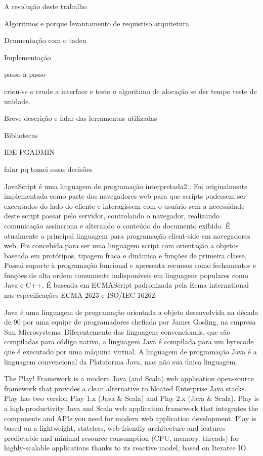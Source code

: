 A resolução deste trabalho

	Algoritmos e porque
	levantamento de requistiso
	arquitetura

	Dcumentação com o tadeu

	Implementação

	passo a passo

	criou-se o crude a interface e testo o algoritimo de alocação se der tempo teste de unidade.



Breve descrição e falar das ferramentas utilizadas

Bibliotecas

IDE
PGADMIN

falar pq tomei essas decisões


	JavaScript é uma linguagem de programação interpretada2 . Foi originalmente implementada como parte dos navegadores web para que scripts pudessem ser executados do lado do cliente e interagissem com o usuário sem a necessidade deste script passar pelo servidor, controlando o navegador, realizando comunicação assíncrona e alterando o conteúdo do documento exibido.
	É atualmente a principal linguagem para programação client-side em navegadores web. Foi concebida para ser uma linguagem script com orientação a objetos baseada em protótipos, tipagem fraca e dinâmica e funções de primeira classe. Possui suporte à programação funcional e apresenta recursos como fechamentos e funções de alta ordem comumente indisponíveis em linguagens populares como Java e C++.
	É baseada em ECMAScript padronizada pela Ecma international nas especificações ECMA-2623 e ISO/IEC 16262.\cite{alterar}

	Java é uma linguagem de programação orientada a objeto desenvolvida na década de 90 por uma equipe de programadores chefiada por James Gosling, na empresa Sun Microsystems. Diferentemente das linguagens convencionais, que são compiladas para código nativo, a linguagem Java é compilada para um bytecode que é executado por uma máquina virtual. A linguagem de programação Java é a linguagem convencional da Plataforma Java, mas não sua única linguagem.\cite{alterar}


	The Play! Framework is a modern Java (and Scala) web application open-source framework that provides a clean alternative to bloated Enterprise Java stacks. Play has two version Play 1.x (Java & Scala) and Play 2.x (Java & Scala).
	Play is a high-productivity Java and Scala web application framework that integrates the components and APIs you need for modern web application development.
	Play is based on a lightweight, stateless, web-friendly architecture and features predictable and minimal resource consumption (CPU, memory, threads) for highly-scalable applications thanks to its reactive model, based on Iteratee IO.\par\cite{alterar}

